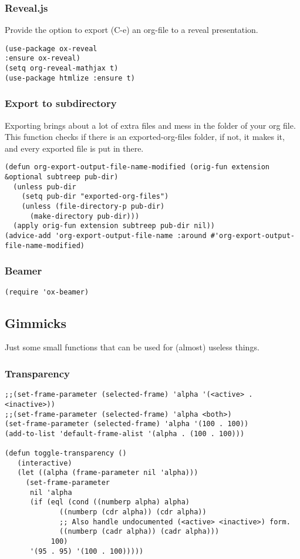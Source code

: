 \documentclass[11pt]{article}
\begin{document}
\subsubsection{Reveal.js}
\label{sec:org1b901a1}
Provide the option to export (C-e) an org-file to a reveal presentation.
\begin{verbatim}
(use-package ox-reveal
:ensure ox-reveal)
(setq org-reveal-mathjax t)
(use-package htmlize :ensure t)
\end{verbatim}
\subsubsection{Export to subdirectory}
\label{sec:org5c27bdd}
Exporting brings about a lot of extra files and mess in the folder of your org file. This function checks if there is an exported-org-files folder, if not, it makes it, and every exported file is put in there.
\begin{verbatim}
(defun org-export-output-file-name-modified (orig-fun extension &optional subtreep pub-dir)
  (unless pub-dir
    (setq pub-dir "exported-org-files")
    (unless (file-directory-p pub-dir)
      (make-directory pub-dir)))
  (apply orig-fun extension subtreep pub-dir nil))
(advice-add 'org-export-output-file-name :around #'org-export-output-file-name-modified)
\end{verbatim}
\subsubsection{Beamer}
\label{sec:org6860759}
\begin{verbatim}
(require 'ox-beamer)
\end{verbatim}
\subsection{Gimmicks}
\label{sec:orgc30d9d5}
Just some small functions that can be used for (almost) useless things.
\subsubsection{Transparency}
\label{sec:org8ae163d}
\begin{verbatim}
;;(set-frame-parameter (selected-frame) 'alpha '(<active> . <inactive>))
;;(set-frame-parameter (selected-frame) 'alpha <both>)
(set-frame-parameter (selected-frame) 'alpha '(100 . 100))
(add-to-list 'default-frame-alist '(alpha . (100 . 100)))

(defun toggle-transparency ()
   (interactive)
   (let ((alpha (frame-parameter nil 'alpha)))
     (set-frame-parameter
      nil 'alpha
      (if (eql (cond ((numberp alpha) alpha)
		     ((numberp (cdr alpha)) (cdr alpha))
		     ;; Also handle undocumented (<active> <inactive>) form.
		     ((numberp (cadr alpha)) (cadr alpha)))
	       100)
	  '(95 . 95) '(100 . 100)))))
\end{verbatim}
\end{document}
